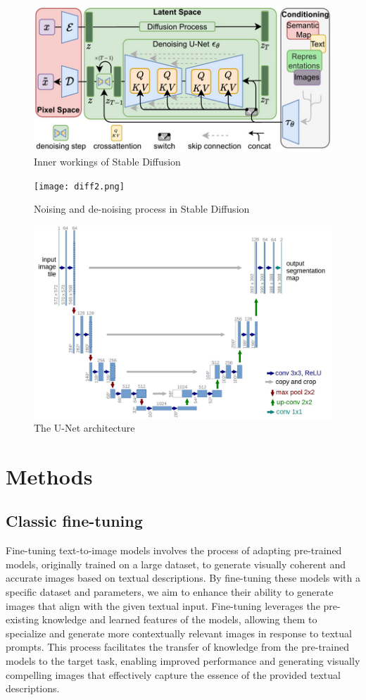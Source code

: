 \documentclass[conference]{IEEEtran}
\begin{document}
\begin{figure}
\centerline{\includegraphics[scale=1.8]{diff.png}}
\caption{Inner workings of Stable Diffusion}
\label{fig1}
\end{figure}

\begin{figure}
\centerline{\texttt{[image: diff2.png]}}
\caption{Noising and de-noising process in Stable Diffusion}
\label{fig2}
\end{figure}

\begin{figure}
\centerline{\includegraphics[scale=0.55]{unet.jpg}}
\caption{The U-Net architecture}
\label{fig3}
\end{figure}

\section{Methods}

\subsection{Classic fine-tuning}
Fine-tuning text-to-image models involves the process of adapting pre-trained models, originally trained on a large dataset, to generate visually coherent and accurate images based on textual descriptions. By fine-tuning these models with a specific dataset and parameters, we aim to enhance their ability to generate images that align with the given textual input. Fine-tuning leverages the pre-existing knowledge and learned features of the models, allowing them to specialize and generate more contextually relevant images in response to textual prompts. This process facilitates the transfer of knowledge from the pre-trained models to the target task, enabling improved performance and generating visually compelling images that effectively capture the essence of the provided textual descriptions.
\end{document}
